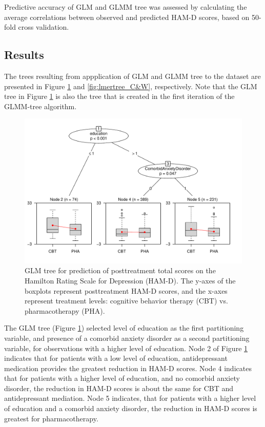\documentclass[nobf,doc]{apa}
\begin{document}
Predictive accuracy of GLM and GLMM tree was assessed by calculating the average correlations between observed and predicted HAM-D scores, based on 50-fold cross validation.

\subsection{Results}

The trees resulting from appplication of GLM and GLMM tree to the dataset are presented in Figure \ref{fig:lmtree_C&W} and \ref{fig:lmertree_C&W}, respectively. Note that the GLM tree in Figure \ref{fig:lmtree_C&W} is also the tree that is created in the first iteration of the GLMM-tree algorithm. 

\begin{figure}[!ht]
    \includegraphics[width=12cm]{app_lmtree.pdf}
	\caption{GLM tree for prediction of posttreatment total scores on the Hamilton Rating Scale for Depression (HAM-D). The y-axes of the boxplots represent posttreatment HAM-D scores, and the x-axes represent treatment levels: cognitive behavior therapy (CBT) vs. pharmacotherapy (PHA).}
	\label{fig:lmtree_C&W}
\end{figure}

The GLM tree (Figure \ref{fig:lmtree_C&W}) selected level of education as the first partitioning variable, and presence of a comorbid anxiety disorder as a second partitioning variable, for observations with a higher level of education. Node 2 of Figure \ref{fig:lmtree_C&W} indicates that for patients with a low level of education, antidepressant medication provides the greatest reduction in HAM-D scores. Node 4 indicates that for patients with a higher level of education, and no comorbid anxiety disorder, the reduction in HAM-D scores is about the same for CBT and antidepressant mediation. Node 5 indicates, that for patients with a higher level of education and a comorbid anxiety disorder, the reduction in HAM-D scores is greatest for pharmacotherapy.
\end{document}
